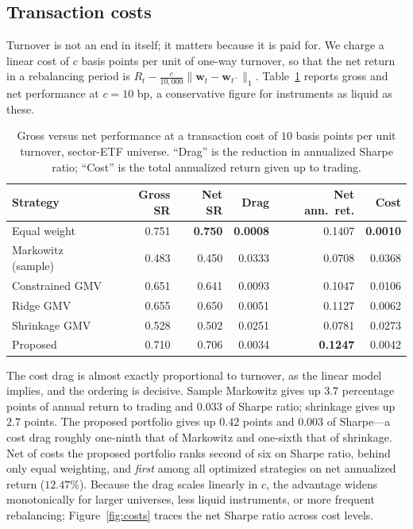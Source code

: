 \documentclass[11pt]{article}
\newcommand{\w}{\mathbf{w}}
\begin{document}
\subsection{Transaction costs}
\label{sec:costs}
Turnover is not an end in itself; it matters because it is paid for. We charge a
linear cost of $c$ basis points per unit of one-way turnover, so that the net
return in a rebalancing period is $R_t-\tfrac{c}{10{,}000}\lVert\w_t-\w_{t^-}\rVert_1$.
Table~\ref{tab:costs} reports gross and net performance at $c=10$ bp, a
conservative figure for instruments as liquid as these.

\begin{table}[htbp]
\centering
\caption{Gross versus net performance at a transaction cost of $10$ basis points
  per unit turnover, sector-ETF universe. ``Drag'' is the reduction in annualized
  Sharpe ratio; ``Cost'' is the total annualized return given up to trading.}
\label{tab:costs}
\begin{tabular}{lrrrrr}
\toprule
\textbf{Strategy} & \textbf{Gross SR} & \textbf{Net SR} & \textbf{Drag} & \textbf{Net ann.\ ret.} & \textbf{Cost} \\
\midrule
Equal weight       & 0.751 & \textbf{0.750} & \textbf{0.0008} & 0.1407 & \textbf{0.0010} \\
Markowitz (sample) & 0.483 & 0.450 & 0.0333 & 0.0708 & 0.0368 \\
Constrained GMV    & 0.651 & 0.641 & 0.0093 & 0.1047 & 0.0106 \\
Ridge GMV          & 0.655 & 0.650 & 0.0051 & 0.1127 & 0.0062 \\
Shrinkage GMV      & 0.528 & 0.502 & 0.0251 & 0.0781 & 0.0273 \\
Proposed           & 0.710 & 0.706 & 0.0034 & \textbf{0.1247} & 0.0042 \\
\bottomrule
\end{tabular}
\end{table}

The cost drag is almost exactly proportional to turnover, as the linear model
implies, and the ordering is decisive. Sample Markowitz gives up $3.7$ percentage
points of annual return to trading and $0.033$ of Sharpe ratio; shrinkage gives
up $2.7$ points. The proposed portfolio gives up $0.42$ points and $0.003$ of
Sharpe---a cost drag roughly one-ninth that of Markowitz and one-sixth that of
shrinkage. Net of costs the proposed portfolio ranks second of six on Sharpe
ratio, behind only equal weighting, and \emph{first} among all optimized
strategies on net annualized return ($12.47\%$). Because the drag scales linearly
in $c$, the advantage widens monotonically for larger universes, less liquid
instruments, or more frequent rebalancing; Figure~\ref{fig:costs} traces the net
Sharpe ratio across cost levels.
\end{document}
